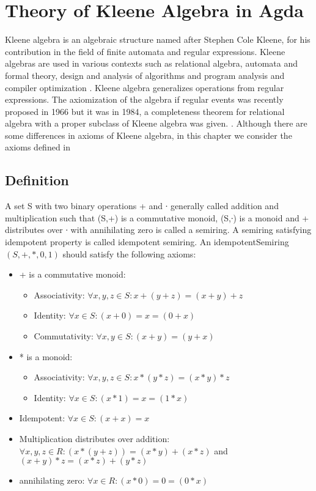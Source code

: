 \chapter{Theory of Kleene Algebra in Agda}
Kleene algebra is an algebraic structure named after Stephen Cole Kleene, for
his contribution in the field of finite automata and regular expressions. Kleene
algebras are used in various contexts such as relational algebra, automata and
formal theory, design and analysis of algorithms and program analysis and
compiler optimization \cite{kozen1997kleene}. Kleene algebra generalizes
operations from regular expressions. The axiomization of the algebra if regular
events was recently proposed in 1966 but it was in 1984, a completeness theorem
for relational algebra with a proper subclass of Kleene algebra was given.
\cite{kozen1994completeness}. Although there are some differences in axioms of
Kleene algebra, in this chapter we consider the axioms defined in
\cite{kozen1994completeness}

\section{Definition}
A set S with two binary operations + and ∙ generally called addition and
multiplication such that (S,+) is a commutative monoid, (S,∙) is a monoid and +
distributes over ∙ with annihilating zero is called a semiring. A semiring
satisfying idempotent property is called idempotent semiring. 
An idempotentSemiring $(S,+,*,0,1)$ should satisfy the following axioms:
\begin{itemize}
  \item + is a commutative monoid:
  \begin{itemize}
    \item Associativity: $\forall x,y,z \in S: x + (y + z) = (x + y) + z$
    \item Identity: $\forall x \in S: (x + 0) = x = (0 + x)$
    \item Commutativity: $\forall x,y \in S: (x + y) = (y + x)$
  \end{itemize}
  \item * is a monoid:
  \begin{itemize}
    \item Associativity: $ \forall x,y,z \in S: x * (y*z)  = (x*y)*z$
    \item Identity: $\forall x \in S: (x * 1) = x = (1 * x)$
  \end{itemize}
  \item Idempotent: $\forall x \in S: (x + x) = x$
  \item Multiplication distributes over addition: \(\forall x , y , z \in R: (x * (y + z)) = (x * y) + (x
  * z)\) and \( (x + y) * z = (x * z) + (y * z) \)
  \item annihilating zero: \(\forall x \in R: (x * 0) = 0 = (0 * x)\)
\end{itemize}

